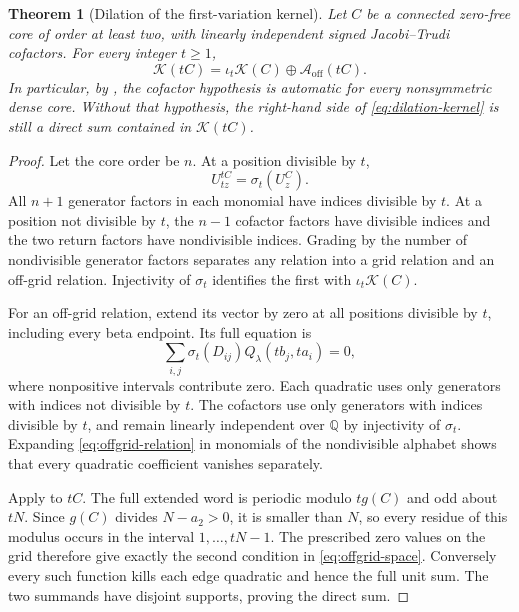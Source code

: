 \documentclass[11pt,a4paper]{amsart}
\numberwithin{equation}{section}
\theoremstyle{plain}
\newtheorem{theorem}{Theorem}[section]
\theoremstyle{definition}
\newcommand{\Q}{\mathbb Q}
\newcommand{\K}{\mathcal K}
\begin{document}
\begin{theorem}[Dilation of the first-variation kernel]\label{thm:dilation}
Let \(C\) be a connected zero-free core of order at least two, with
linearly independent signed Jacobi--Trudi cofactors.  For every integer
\(t\ge1\),
\begin{equation}\label{eq:dilation-kernel}
 \K(tC)=\iota_t\K(C)\oplus\mathcal A_{\mathrm{off}}(tC).
\end{equation}
In particular, by , the cofactor hypothesis is
automatic for every nonsymmetric dense core.  Without that hypothesis, the
right-hand side of \eqref{eq:dilation-kernel} is still a direct sum contained
in \(\K(tC)\).
\end{theorem}

\begin{proof}
Let the core order be \(n\).  At a position divisible by \(t\),
\[
 U_{tz}^{tC}=\sigma_t(U_z^C).
\]
All \(n+1\) generator factors in each monomial have indices divisible by
\(t\).  At a position not divisible by \(t\), the \(n-1\) cofactor
factors have divisible indices and the two return factors have nondivisible
indices.  Grading by the number of nondivisible generator factors separates
any relation into a grid relation and an off-grid relation.  Injectivity of
\(\sigma_t\) identifies the first with \(\iota_t\K(C)\).

For an off-grid relation, extend its vector by zero at all positions divisible
by \(t\), including every beta endpoint.  Its full equation is
\begin{equation}\label{eq:offgrid-relation}
 \sum_{i,j}\sigma_t(D_{ij})
       Q_\lambda(tb_j,ta_i)=0,
\end{equation}
where nonpositive intervals contribute zero.
Each quadratic uses only generators with indices not divisible by \(t\).
The cofactors use only generators with indices divisible by \(t\), and
remain linearly independent over \(\Q\) by injectivity of \(\sigma_t\).
Expanding \eqref{eq:offgrid-relation} in monomials of the nondivisible
alphabet shows that every quadratic coefficient vanishes separately.

Apply  to \(tC\).
The full extended word is periodic modulo \(tg(C)\) and odd about \(tN\).
Since \(g(C)\) divides \(N-a_2>0\), it is smaller than \(N\), so every
residue of this modulus occurs in the interval
\(1,\ldots,tN-1\).  The prescribed zero values on the grid therefore give
exactly the second condition in \eqref{eq:offgrid-space}.
Conversely every such function kills each edge quadratic and hence the full
unit sum.  The two summands have disjoint supports, proving the direct sum.
\end{proof}
\end{document}
